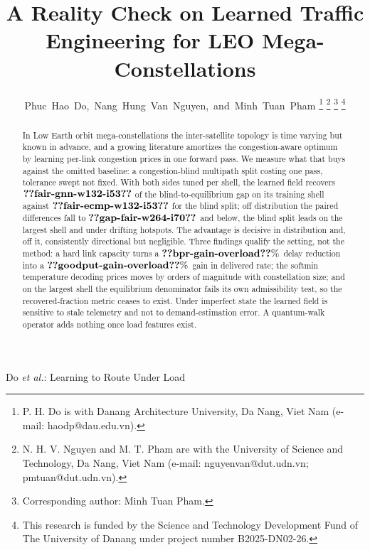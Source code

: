 \documentclass[journal]{IEEEtran}
\begin{document}
\title{A Reality Check on Learned Traffic Engineering for LEO Mega-Constellations}

\author{Phuc~Hao~Do,~Nang~Hung~Van~Nguyen,~and~Minh~Tuan~Pham%
\thanks{P. H. Do is with Danang Architecture University, Da Nang, Viet Nam
(e-mail: haodp@dau.edu.vn).}%
\thanks{N. H. V. Nguyen and M. T. Pham are with the University of Science and
Technology, Da Nang, Viet Nam (e-mail: nguyenvan@dut.udn.vn; pmtuan@dut.udn.vn).}%
\thanks{Corresponding author: Minh Tuan Pham.}%
\thanks{This research is funded by the Science and Technology Development Fund of The
University of Danang under project number B2025-DN02-26.}}

%
{Do \MakeLowercase{\textit{et al.}}: Learning to Route Under Load}

\maketitle

\begin{abstract}
In Low Earth orbit mega-constellations the inter-satellite topology is time varying but
known in advance, and a growing literature amortizes the congestion-aware optimum by
learning per-link congestion prices in one forward pass. We measure what that buys against
the omitted baseline: a congestion-blind multipath split costing one pass, tolerance swept
not fixed. With both sides tuned per shell, the learned field recovers
$\clm{fair-gnn-w132-i53}$ of the blind-to-equilibrium gap on its training shell against
$\clm{fair-ecmp-w132-i53}$ for the blind split; off distribution the paired differences fall
to $\clm{gap-fair-w264-i70}$ and below, the blind split leads on the largest shell and
under drifting hotspots. The advantage is decisive in distribution and, off it,
consistently directional but negligible. Three findings qualify the setting, not the method:
a hard link capacity turns a $\clm{bpr-gain-overload}\%$ delay reduction into a
$\clm{goodput-gain-overload}\%$ gain in delivered rate; the softmin temperature decoding
prices moves by orders of magnitude with constellation size; and on the largest shell the
equilibrium denominator fails its own admissibility test, so the recovered-fraction metric
ceases to exist. Under imperfect state the learned field is sensitive to stale telemetry and
not to demand-estimation error. A quantum-walk operator adds nothing once load features exist.
\end{abstract}
\end{document}
